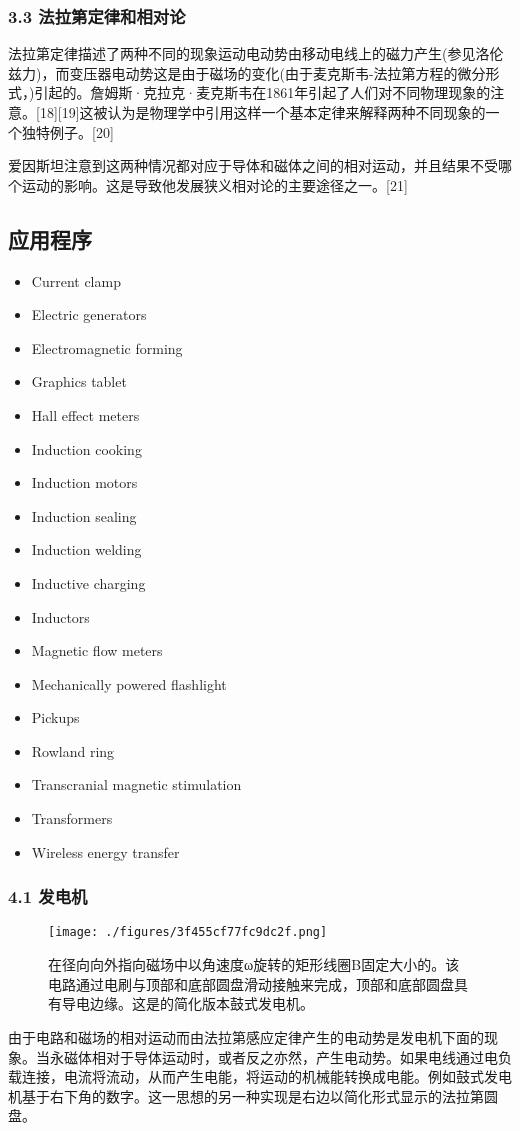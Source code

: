 \subsubsection{3.3 法拉第定律和相对论}
法拉第定律描述了两种不同的现象运动电动势由移动电线上的磁力产生(参见洛伦兹力)，而变压器电动势这是由于磁场的变化(由于麦克斯韦-法拉第方程的微分形式，)引起的。詹姆斯·克拉克·麦克斯韦在1861年引起了人们对不同物理现象的注意。[18][19]这被认为是物理学中引用这样一个基本定律来解释两种不同现象的一个独特例子。[20]

爱因斯坦注意到这两种情况都对应于导体和磁体之间的相对运动，并且结果不受哪个运动的影响。这是导致他发展狭义相对论的主要途径之一。[21]
\subsection{应用程序}
\begin{itemize}
\item Current clamp
\item Electric generators
\item Electromagnetic forming
\item Graphics tablet
\item Hall effect meters
\item Induction cooking
\item Induction motors
\item Induction sealing
\item Induction welding
\item Inductive charging
\item Inductors
\item Magnetic flow meters
\item Mechanically powered flashlight
\item Pickups
\item Rowland ring
\item Transcranial magnetic stimulation
\item Transformers
\item Wireless energy transfer
\end{itemize}
\subsubsection{4.1 发电机}
\begin{figure}[ht]
\centering
\texttt{[image: ./figures/3f455cf77fc9dc2f.png]}
\caption{在径向向外指向磁场中以角速度ω旋转的矩形线圈B固定大小的。该电路通过电刷与顶部和底部圆盘滑动接触来完成，顶部和底部圆盘具有导电边缘。这是的简化版本鼓式发电机。} \label{fig_DCGY_7}
\end{figure}
由于电路和磁场的相对运动而由法拉第感应定律产生的电动势是发电机下面的现象。当永磁体相对于导体运动时，或者反之亦然，产生电动势。如果电线通过电负载连接，电流将流动，从而产生电能，将运动的机械能转换成电能。例如鼓式发电机基于右下角的数字。这一思想的另一种实现是右边以简化形式显示的法拉第圆盘。

